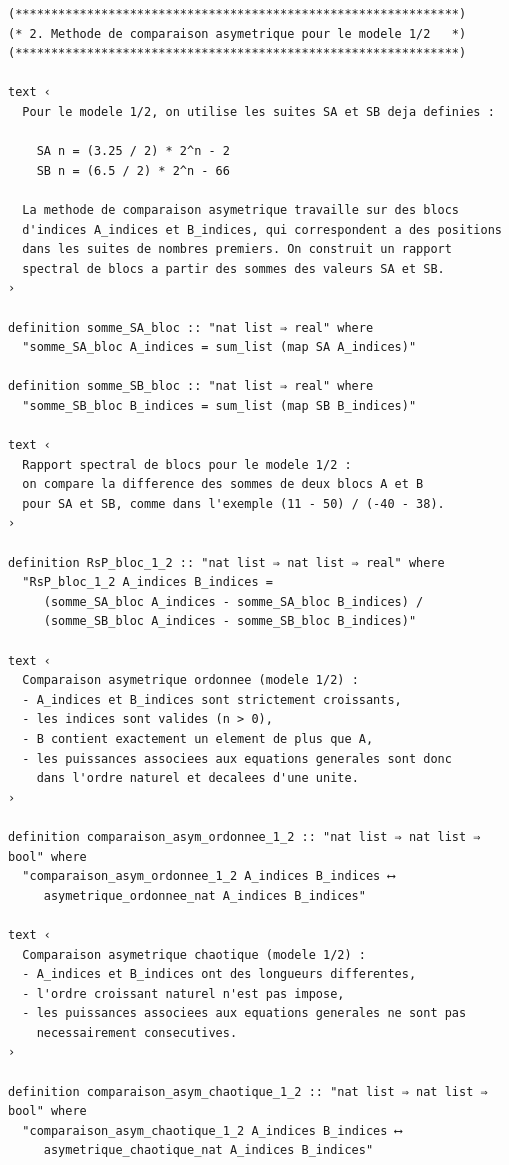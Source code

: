 \documentclass[a4paper,11pt]{article}
\begin{document}
\begin{holcode}[title={\textcolor{white}{Fichier : methode\_spectral.thy -- Partie 1/4}}]
\begin{lstlisting}
(**************************************************************)
(* 2. Methode de comparaison asymetrique pour le modele 1/2   *)
(**************************************************************)

text ‹
  Pour le modele 1/2, on utilise les suites SA et SB deja definies :

    SA n = (3.25 / 2) * 2^n - 2
    SB n = (6.5 / 2) * 2^n - 66

  La methode de comparaison asymetrique travaille sur des blocs
  d'indices A_indices et B_indices, qui correspondent a des positions
  dans les suites de nombres premiers. On construit un rapport
  spectral de blocs a partir des sommes des valeurs SA et SB.
›

definition somme_SA_bloc :: "nat list ⇒ real" where
  "somme_SA_bloc A_indices = sum_list (map SA A_indices)"

definition somme_SB_bloc :: "nat list ⇒ real" where
  "somme_SB_bloc B_indices = sum_list (map SB B_indices)"

text ‹
  Rapport spectral de blocs pour le modele 1/2 :
  on compare la difference des sommes de deux blocs A et B
  pour SA et SB, comme dans l'exemple (11 - 50) / (-40 - 38).
›

definition RsP_bloc_1_2 :: "nat list ⇒ nat list ⇒ real" where
  "RsP_bloc_1_2 A_indices B_indices =
     (somme_SA_bloc A_indices - somme_SA_bloc B_indices) /
     (somme_SB_bloc A_indices - somme_SB_bloc B_indices)"

text ‹
  Comparaison asymetrique ordonnee (modele 1/2) :
  - A_indices et B_indices sont strictement croissants,
  - les indices sont valides (n > 0),
  - B contient exactement un element de plus que A,
  - les puissances associees aux equations generales sont donc
    dans l'ordre naturel et decalees d'une unite.
›

definition comparaison_asym_ordonnee_1_2 :: "nat list ⇒ nat list ⇒ bool" where
  "comparaison_asym_ordonnee_1_2 A_indices B_indices ⟷
     asymetrique_ordonnee_nat A_indices B_indices"

text ‹
  Comparaison asymetrique chaotique (modele 1/2) :
  - A_indices et B_indices ont des longueurs differentes,
  - l'ordre croissant naturel n'est pas impose,
  - les puissances associees aux equations generales ne sont pas
    necessairement consecutives.
›

definition comparaison_asym_chaotique_1_2 :: "nat list ⇒ nat list ⇒ bool" where
  "comparaison_asym_chaotique_1_2 A_indices B_indices ⟷
     asymetrique_chaotique_nat A_indices B_indices"


\end{lstlisting}
\end{holcode}
\end{document}
